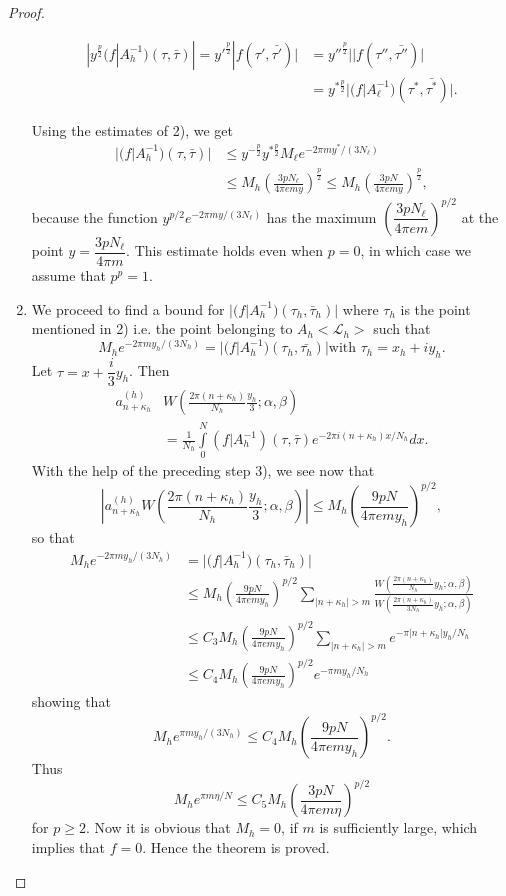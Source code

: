 \begin{proof}
\begin{enumerate}
\begin{align*}
|y^{\frac{p}{2}} (f|A^{-1}_h)(\tau,\bar{\tau})| = y'^{\frac{p}{2}}
|f(\tau',\bar{\tau'})| & = y''^{\frac{p}{2}}
||f(\tau'',\bar{\tau''})|\\
& = y^{\ast\frac{p}{2}} |(f|A^{-1}_{\ell})(\tau^{\ast},\bar{\tau^{\ast}})|.
\end{align*}

Using \pageoriginale the estimates of 2), we get 
\begin{align*}
|(f|A^{-1}_h)(\tau,\bar{\tau})| & \leq y^{-\frac{p}{2}}
y^{\ast\frac{p}{2}} M_{\ell} e^{-2\pi my^{\ast}/(3N_{\ell})}\\
& \leq M_h(\frac{3pN_{\ell}}{4\pi e my})^{\frac{p}{2}} \leq M_h
(\frac{3pN}{4\pi emy})^{\frac{p}{2}},
\end{align*}
because the function $y^{p/2}e^{-2\pi my/(3N_{\ell})}$ has the
maximum $(\dfrac{3pN_{\ell}}{4\pi em})^{p/2}$ at the point
$y=\dfrac{3pN_{\ell}}{4\pi m}$. This estimate holds even when $p=0$,
in which case we assume that $p^p=1$.

\item We proceed to find a bound for
  $|(f|A^{-1}_h)(\tau_h,\bar{\tau}_h)|$ where $\tau_h$ is the point
  mentioned in 2) i.e. the point belonging to $A_h<\mathscr{L}_h>$
  such that 
$$
M_h e^{-2\pi my_h/(3N_h)} = |(f|A^{-1}_h)(\tau_h,\bar{\tau_h})| \text{
  with } \tau_h = x_h + iy_h.
$$
Let $\tau=x+\dfrac{i}{3}y_h$. Then
\begin{align*}
a^{(h)}_{n+\kappa_h} & W(\frac{2\pi(n+\kappa_h)}{N_h}
\frac{y_h}{3};\alpha,\beta)\\
& = \frac{1}{N_h} \int\limits^N_0 (f|A^{-1}_h)
(\tau,\bar{\tau})e^{-2\pi i(n+\kappa_h)x/N_{h}}dx.
\end{align*}
With the help of the preceding step 3), we see now that
$$
|a^{(h)}_{n+\kappa_h} W (\frac{2\pi
  (n+\kappa_h)}{N_h}\frac{y_h}{3};\alpha, \beta)| \leq M_h
(\frac{9pN}{4\pi emy_h})^{p/2},
$$
so that
\begin{align*}
M_h e^{-2\pi my_h/(3N_h)} & = |(f|A^{-1}_h)(\tau_h,\bar{\tau}_h)|\\
& \leq M_h(\frac{9pN}{4\pi emy_h})^{p/2} \sum_{|n+\kappa_h|>m}
\frac{W(\frac{2\pi(n+\kappa_h)}{N_h} y_h; \alpha, \beta)}{W
(\frac{2\pi(n+\kappa_h)}{3N_h}y_h;\alpha, \beta)}\\
& \leq C_3 M_h (\frac{9pN}{4\pi e my_h})^{p/2} \sum_{|n+\kappa_h|>m}
e^{-\pi|n+\kappa_h|y_h/N_h}\\
& \leq C_4 M_h (\frac{9pN}{4\pi emy_h})^{p/2} e^{-\pi my_h/N_h}
\end{align*}\pageoriginale
showing that 
$$
M_h e^{\pi my_h/(3N_h)} \leq C_4 M_h (\frac{9pN}{4\pi emy_h})^{p/2}. 
$$
Thus
$$
M_h e^{\pi m \eta/N} \leq C_5 M_h (\frac{3pN}{4\pi em\eta})^{p/2}
$$
for $p\geq 2$. Now it is obvious that $M_h=0$, if $m$ is sufficiently
large, which implies that $f=0$. Hence the theorem is proved.
\end{enumerate}
\end{proof}

